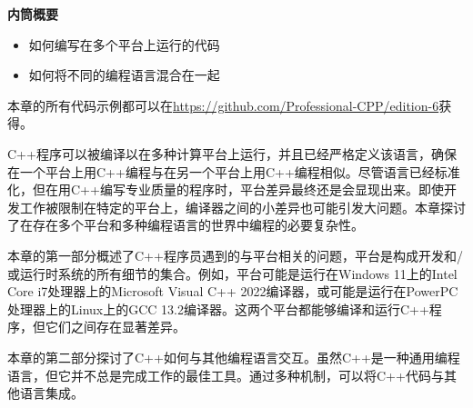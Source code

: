 \noindent
\textbf{内筒概要}

\begin{itemize}
\item
如何编写在多个平台上运行的代码

\item
如何将不同的编程语言混合在一起
\end{itemize}

本章的所有代码示例都可以在\url{https://github.com/Professional-CPP/edition-6}获得。

C++程序可以被编译以在多种计算平台上运行，并且已经严格定义该语言，确保在一个平台上用C++编程与在另一个平台上用C++编程相似。尽管语言已经标准化，但在用C++编写专业质量的程序时，平台差异最终还是会显现出来。即使开发工作被限制在特定的平台上，编译器之间的小差异也可能引发大问题。本章探讨了在存在多个平台和多种编程语言的世界中编程的必要复杂性。

本章的第一部分概述了C++程序员遇到的与平台相关的问题，平台是构成开发和/或运行时系统的所有细节的集合。例如，平台可能是运行在Windows 11上的Intel Core i7处理器上的Microsoft Visual C++ 2022编译器，或可能是运行在PowerPC处理器上的Linux上的GCC 13.2编译器。这两个平台都能够编译和运行C++程序，但它们之间存在显著差异。

本章的第二部分探讨了C++如何与其他编程语言交互。虽然C++是一种通用编程语言，但它并不总是完成工作的最佳工具。通过多种机制，可以将C++代码与其他语言集成。


